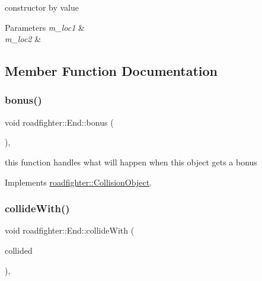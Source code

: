 constructor by value 
\begin{DoxyParams}{Parameters}
{\em m\+\_\+loc1} & \\
\hline
{\em m\+\_\+loc2} & \\
\hline
\end{DoxyParams}


\subsection{Member Function Documentation}
\mbox{\label{classroadfighter_1_1End_a501a09cafb9de82e3a6af39e9524eb3d}} 
\subsubsection{\texorpdfstring{bonus()}{bonus()}}
{\footnotesize\ttfamily void roadfighter\+::\+End\+::bonus (\begin{DoxyParamCaption}{ }\end{DoxyParamCaption})\hspace{0.3cm}{\ttfamily [override]}, {\ttfamily [virtual]}}

this function handles what will happen when this object gets a bonus 

Implements \hyperlink{classroadfighter_1_1CollisionObject_a157e499c27619ceefd6179a459fafd90}{roadfighter\+::\+Collision\+Object}.

\mbox{\label{classroadfighter_1_1End_a56dfbe6f0c760a5728b58fc9d9f40486}} 
\subsubsection{\texorpdfstring{collide\+With()}{collideWith()}}
{\footnotesize\ttfamily void roadfighter\+::\+End\+::collide\+With (\begin{DoxyParamCaption}\item[{std\+::shared\+\_\+ptr$<$ \hyperlink{classroadfighter_1_1CollisionObject}{Collision\+Object} $>$ \&}]{collided }\end{DoxyParamCaption})\hspace{0.3cm}{\ttfamily [override]}, {\ttfamily [virtual]}}

